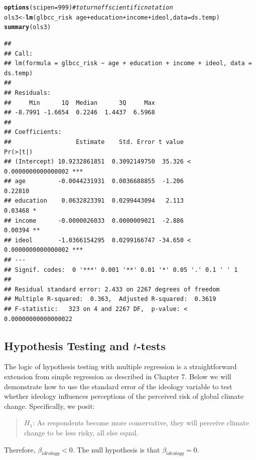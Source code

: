 \documentclass[11pt,openany]{book}\usepackage[]{graphicx}\usepackage[]{color}
\makeatletter
\newcommand{\hlnum}[1]{\textcolor[rgb]{0.686,0.059,0.569}{#1}}%
\newcommand{\hlcom}[1]{\textcolor[rgb]{0.678,0.584,0.686}{\textit{#1}}}%
\newcommand{\hlopt}[1]{\textcolor[rgb]{0,0,0}{#1}}%
\newcommand{\hlstd}[1]{\textcolor[rgb]{0.345,0.345,0.345}{#1}}%
\newcommand{\hlkwb}[1]{\textcolor[rgb]{0.69,0.353,0.396}{#1}}%
\newcommand{\hlkwc}[1]{\textcolor[rgb]{0.333,0.667,0.333}{#1}}%
\newcommand{\hlkwd}[1]{\textcolor[rgb]{0.737,0.353,0.396}{\textbf{#1}}}%
\newenvironment{kframe}{%
 \def\at@end@of@kframe{}%
 \ifinner\ifhmode%
  \def\at@end@of@kframe{\end{minipage}}%
  \begin{minipage}{\columnwidth}%
 \fi\fi%
 \def\FrameCommand##1{\hskip\@totalleftmargin \hskip-\fboxsep
 \colorbox{shadecolor}{##1}\hskip-\fboxsep
     \hskip-\linewidth \hskip-\@totalleftmargin \hskip\columnwidth}%
 \MakeFramed {\advance\hsize-\width
   \@totalleftmargin\z@ \linewidth\hsize
   \@setminipage}}%
 {\par\unskip\endMakeFramed%
 \at@end@of@kframe}
\newenvironment{knitrout}{}{} %
\renewenvironment{knitrout}{\begin{singlespace}}{\end{singlespace}}
\makeatother
\begin{document}
\begin{knitrout}
\color{fgcolor}\begin{kframe}
\begin{alltt}
\hlkwd{options}\hlstd{(}\hlkwc{scipen} \hlstd{=} \hlnum{999}\hlstd{)}  \hlcom{#to turn off scientific notation}
\hlstd{ols3} \hlkwb{<-} \hlkwd{lm}\hlstd{(glbcc_risk} \hlopt{~} \hlstd{age} \hlopt{+} \hlstd{education} \hlopt{+} \hlstd{income} \hlopt{+} \hlstd{ideol,} \hlkwc{data} \hlstd{= ds.temp)}
\hlkwd{summary}\hlstd{(ols3)}
\end{alltt}
\begin{verbatim}
## 
## Call:
## lm(formula = glbcc_risk ~ age + education + income + ideol, data = ds.temp)
## 
## Residuals:
##     Min      1Q  Median      3Q     Max 
## -8.7991 -1.6654  0.2246  1.4437  6.5968 
## 
## Coefficients:
##                  Estimate    Std. Error t value             Pr(>|t|)    
## (Intercept) 10.9232861851  0.3092149750  35.326 < 0.0000000000000002 ***
## age         -0.0044231931  0.0036688855  -1.206              0.22810    
## education    0.0632823391  0.0299443094   2.113              0.03468 *  
## income      -0.0000026033  0.0000009021  -2.886              0.00394 ** 
## ideol       -1.0366154295  0.0299166747 -34.650 < 0.0000000000000002 ***
## ---
## Signif. codes:  0 '***' 0.001 '**' 0.01 '*' 0.05 '.' 0.1 ' ' 1
## 
## Residual standard error: 2.433 on 2267 degrees of freedom
## Multiple R-squared:  0.363,	Adjusted R-squared:  0.3619 
## F-statistic:   323 on 4 and 2267 DF,  p-value: < 0.00000000000000022
\end{verbatim}
\end{kframe}
\end{knitrout}

\subsection{Hypothesis Testing and $t$-tests}

The logic of hypothesis testing with multiple regression is a straightforward extension from  simple regression as described in Chapter 7. Below we will demonstrate how to use the standard error of the ideology variable to test whether ideology influences perceptions of the perceived risk of global climate change. Specifically, we posit:
\begin{quote}
{$H_1$}: As respondents become more conservative, they will perceive climate change to be less risky, all else equal. 
\end{quote}
Therefore, $\beta_{ideology} < 0$. The null
hypothesis is that $\beta_{ideology} = 0$. 
\end{document}

